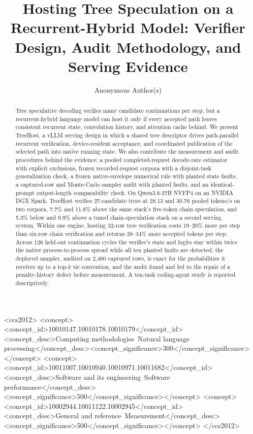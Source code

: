 \documentclass[sigconf,anonymous,review]{acmart}
\newcommand{\sys}{TreeHost}
\begin{document}
\title{Hosting Tree Speculation on a Recurrent-Hybrid Model: Verifier Design, Audit Methodology, and Serving Evidence}
\author{Anonymous Author(s)}
\begin{abstract}
Tree speculative decoding verifies many candidate continuations per step, but a recurrent-hybrid language model can host it only if every accepted path leaves consistent recurrent state, convolution history, and attention cache behind. We present \sys{}, a vLLM serving design in which a shared tree descriptor drives path-parallel recurrent verification, device-resident acceptance, and coordinated publication of the selected path into native running state. We also contribute the measurement and audit procedures behind the evidence: a pooled completed-request decode-rate estimator with explicit exclusions, frozen recorded-request corpora with a disjoint-task generalization check, a frozen native-envelope numerical rule with planted state faults, a captured-row and Monte-Carlo sampler audit with planted faults, and an identical-prompt output-length comparability check. On Qwen3.8-27B NVFP4 on an NVIDIA DGX Spark, \sys{} verifies 27-candidate trees at 28.13 and 30.76 pooled tokens/s on two corpora, 7.7\% and 11.8\% above the same stack's five-token chain speculation, and 5.3\% below and 0.9\% above a tuned chain-speculation stack on a second serving system. Within one engine, hosting 32-row tree verification costs 19--20\% more per step than six-row chain verification and returns 28--34\% more accepted tokens per step. Across 126 held-out continuation cycles the verifier's state and logits stay within twice the native process-to-process spread while all ten planted faults are detected; the deployed sampler, audited on 2,480 captured rows, is exact for the probabilities it receives up to a top-$k$ tie convention, and the audit found and led to the repair of a penalty-history defect before measurement. A ten-task coding-agent study is reported descriptively.
\end{abstract}
\begin{CCSXML}
<ccs2012>
<concept><concept_id>10010147.10010178.10010179</concept_id><concept_desc>Computing methodologies~Natural language processing</concept_desc><concept_significance>300</concept_significance></concept>
<concept><concept_id>10011007.10010940.10010971.10011682</concept_id><concept_desc>Software and its engineering~Software performance</concept_desc><concept_significance>500</concept_significance></concept>
<concept><concept_id>10002944.10011122.10002945</concept_id><concept_desc>General and reference~Measurement</concept_desc><concept_significance>500</concept_significance></concept>
</ccs2012>
\end{CCSXML}
\maketitle
\end{document}
